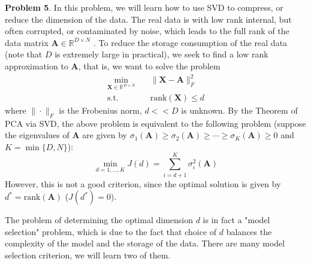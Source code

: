 \documentclass[english,onecolumn]{IEEEtran}
\begin{document}
\clearpage
\newpage
\noindent\textbf{Problem 5}.
In this problem, we will learn how to use SVD to compress, or reduce the dimension of the data. The real data is with low rank internal, but often corrupted, or contaminated by noise, which leads to the full rank of the data matrix $\mathbf{A}\in\mathbb{R}^{D\times N}$ . To reduce the storage consumption of the real data (note that $D$ is extremely large in practical), we seek to find a low rank approximation to  $\mathbf{A}$, that is, we want to solve the problem
\begin{align}
    \min_{\mathbf{X}\in\mathbb{R}^{D\times N}}&\quad \|\mathbf{X}-\mathbf{A}\|_F^2\\
    \mathrm{s.t.}&\quad \mathrm{rank}(\mathbf{X})\leq d
\end{align}
where $\|\cdot\|_F$ is the Frobenius norm, $d<< D$ is unknown.
By the Theorem of PCA via SVD, the above problem is equivalent to the following problem (suppose the eigenvalues of $\mathbf{A}$ are given by $\sigma_1(\mathbf{A})\geq\sigma_2(\mathbf{A})\geq\cdots\geq \sigma_K(\mathbf{A})\geq0$ and $K=\min\{D,N\}$):
\begin{equation}
    \min_{d=1,\dots,K}J(d)=\sum_{i=d+1}^K\sigma_i^2(\mathbf{A})
\end{equation}
However, this is not a good criterion, since the optimal solution is given by $d^*=\mathrm{rank}(\mathbf{A})$ ($J(d^*)=0$).

The problem of determining the optimal dimension $d$ is in fact a "model selection" problem, which is due to the fact that choice of $d$ balances the complexity of the model and the storage of the data. There are many model selection criterion, we will learn two of them.
\end{document}

